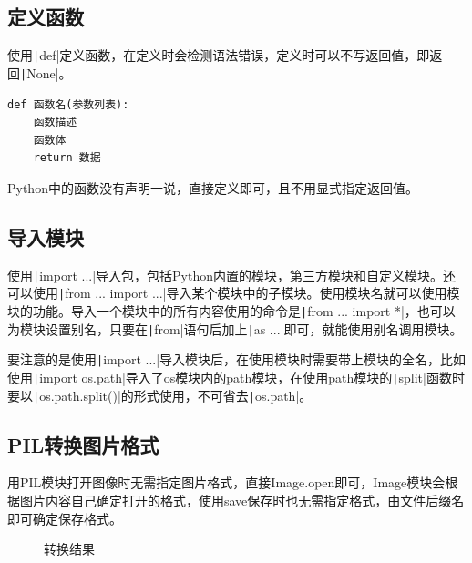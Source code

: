 \documentclass[fontset=ubuntu]{ctexart}
\begin{document}
\subsection{定义函数}
使用\texttt|def|定义函数，在定义时会检测语法错误，定义时可以不写返回值，即返回\texttt|None|。
\begin{listing}[htb]
    \begin{verbatim}
def 函数名(参数列表):
    函数描述
    函数体
    return 数据
    \end{verbatim}
\end{listing}

Python中的函数没有声明一说，直接定义即可，且不用显式指定返回值。

\subsection{导入模块}
使用\texttt|import ...|导入包，包括Python内置的模块，第三方模块和自定义模块。还可以使用\texttt|from ... import ...|导入某个模块中的子模块。使用模块名就可以使用模块的功能。导入一个模块中的所有内容使用的命令是\texttt|from ... import *|，也可以为模块设置别名，只要在\texttt|from|语句后加上\texttt|as ...|即可，就能使用别名调用模块。

要注意的是使用\texttt|import ...|导入模块后，在使用模块时需要带上模块的全名，比如使用\texttt|import os.path|导入了os模块内的path模块，在使用path模块的\texttt|split|函数时要以\texttt|os.path.split()|的形式使用，不可省去\texttt|os.path|。

\subsection{PIL转换图片格式}
用PIL模块打开图像时无需指定图片格式，直接Image.open即可，Image模块会根据图片内容自己确定打开的格式，使用save保存时也无需指定格式，由文件后缀名即可确定保存格式。
\begin{figure}[htb]
    \centering
    \caption{转换结果}
    \label{convert_2}
\end{figure}
\end{document}
